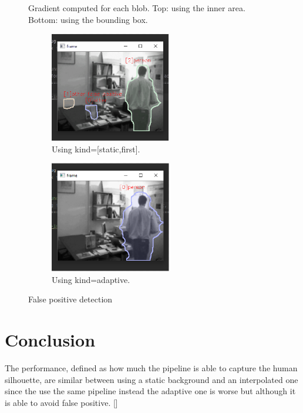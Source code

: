 \documentclass{article}
\newcommand{\CREF}[1]{[\hyperref[#1]{\Cref{#1}}]}
\begin{document}
\begin{figure}
    \caption{Gradient computed for each blob. Top: using the inner area. Bottom: using the bounding box.}
    \label{grad}
\end{figure}

\begin{figure}[ht]
    \centering
    \begin{subfigure}{0.47\textwidth}
        \centering
        \includegraphics[width=150pt,keepaspectratio]{background_static_falsepositive.PNG}
        \caption{Using kind=[static,first].}
        \label{Figure:fpl}
    \end{subfigure}
    \begin{subfigure}{0.47\textwidth}
        \centering
        \includegraphics[width=150pt,keepaspectratio]{background_adaptive_falsepositive.PNG}
        \caption{Using kind=adaptive.}
        \label{Figure:fpi}
    \end{subfigure}
    \caption{False positive detection}
\end{figure}

\section{Conclusion}
The performance, defined as how much the pipeline is able to capture the human silhouette, are similar between using a static background and an interpolated one since the use the same pipeline instead the adaptive one is worse but although it is able to avoid false positive. \CREF{out481}
\end{document}
